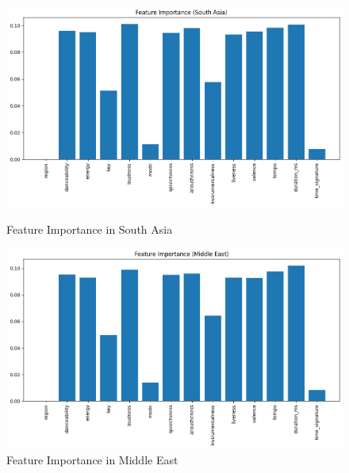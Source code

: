 \begin{figure}[h]
    \centering
    \begin{minipage}{0.45\textwidth}
        \centering
        \includegraphics[width=\linewidth]{media/rf_feature_imp_south_asia.png}
        \caption{Feature Importance in South Asia}
    \end{minipage}%
    \hspace{0.05\textwidth} %
    \begin{minipage}{0.45\textwidth}
        \centering
        \includegraphics[width=\linewidth]{media/rf_feature_imp_middle_east.png}
        \caption{Feature Importance in Middle East}
    \end{minipage}
\end{figure}
